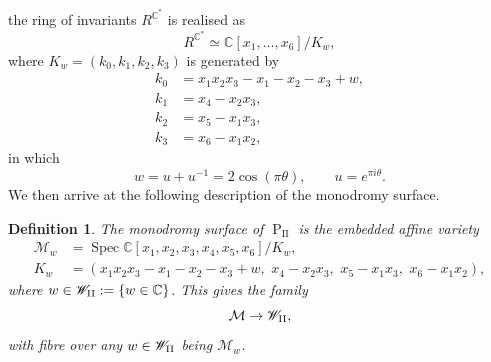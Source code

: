 \documentclass[a4paper,reqno]{amsart}
\numberwithin{equation}{section}
\newcommand{\C}{\mathbb{C}}
\newcommand{\pain}[1]{\operatorname{P}_{\mathrm{#1}}}
\DeclareMathOperator{\Spec}{Spec}
\newtheorem{definition}[theorem]{Definition}
\numberwithin{equation}{section}
\begin{document}
the ring of invariants $R^{\C^*}$ is realised as 
\begin{equation}\label{eq:ringofinvariants}
    R^{\C^*} \simeq \C[x_1,\dots,x_6]/K_w,
\end{equation}
where $K_w=(k_0,k_1,k_2,k_3)$ is generated by
\begin{equation*}
    \begin{aligned}
        k_0 &= x_1 x_2 x_3 - x_1 -x_2 -x_3  + w, \\
        k_1 &= x_4 - x_2 x_3, \\
        k_2 &= x_5 - x_1 x_3, \\
        k_3 &= x_6 - x_1 x_2, 
    \end{aligned}
\end{equation*}
in which
\begin{equation*}
    w=u + u^{-1}=2\cos(\pi \theta) ,\qquad u=e^{\pi i \theta}.
\end{equation*}
We then arrive at the following description of the monodromy surface.


\begin{definition} \label{def:monodromysurfacePII}
    The monodromy surface of $\pain{II}$ is the embedded affine variety
    \begin{equation*}
    \begin{aligned}
        \mathcal{M}_w &= \Spec \C[x_1,x_2,x_3,x_4,x_5,x_6]/K_{w}, \\  
        K_w &= (x_1 x_2 x_3 - x_1 -x_2 -x_3  + w, \,\,
        x_4 - x_2 x_3,\,\,
        x_5 - x_1 x_3, \,\,
        x_6 - x_1 x_2),
    \end{aligned}
    \end{equation*}
    where $w\in \mathscr{W}_{\rm{II}}:= \left\{ w\in \C\right\}$.
    This gives the family
    \begin{equation*}
        \mathcal{M}\to\mathscr{W}_{\rm{II}},
    \end{equation*}
    with fibre over any $w\in\mathscr{W}_{\rm{II}}$ being $\mathcal{M}_{w}$.
\end{definition}
\end{document}
